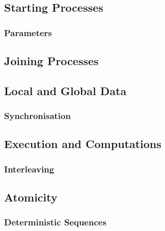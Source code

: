 \documentclass[a4paper, 11pt, accentcolor = tud3b]{tudreport}
\begin{document}
            \subsection{Starting Processes} %

                \subsubsection{Parameters} %

            \subsection{Joining Processes} %

            \subsection{Local and Global Data} %

                \subsubsection{Synchronisation} %

            \subsection{Execution and Computations} %

                \subsubsection{Interleaving} %

            \subsection{Atomicity} %

                \subsubsection{Deterministic Sequences} %
\end{document}
